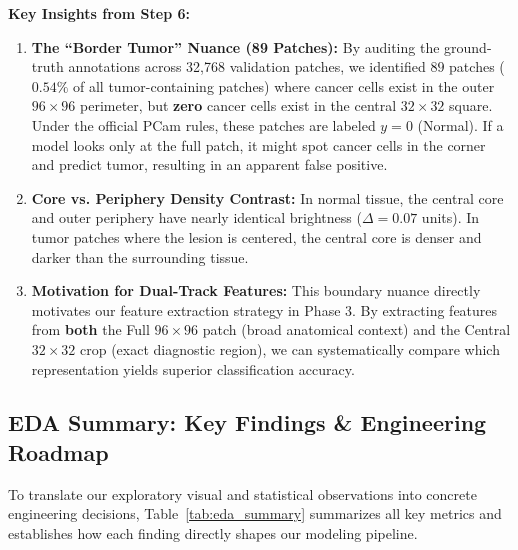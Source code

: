 \documentclass[11pt,a4paper]{article}
\begin{document}
\noindent\textbf{Key Insights from Step 6:}
\begin{enumerate}[noitemsep]
    \item \textbf{The ``Border Tumor'' Nuance (89 Patches):}
    By auditing the ground-truth annotations across 32,768 validation patches, we identified $89$ patches ($0.54\%$ of all tumor-containing patches) where cancer cells exist in the outer $96 \times 96$ perimeter, but \textbf{zero} cancer cells exist in the central $32 \times 32$ square. Under the official PCam rules, these patches are labeled $y = 0$ (Normal). If a model looks only at the full patch, it might spot cancer cells in the corner and predict tumor, resulting in an apparent false positive.
    \item \textbf{Core vs. Periphery Density Contrast:}
    In normal tissue, the central core and outer periphery have nearly identical brightness ($\Delta = 0.07$ units). In tumor patches where the lesion is centered, the central core is denser and darker than the surrounding tissue.
    \item \textbf{Motivation for Dual-Track Features:}
    This boundary nuance directly motivates our feature extraction strategy in Phase 3. By extracting features from \textbf{both} the Full $96 \times 96$ patch (broad anatomical context) and the Central $32 \times 32$ crop (exact diagnostic region), we can systematically compare which representation yields superior classification accuracy.
\end{enumerate}

\subsection{EDA Summary: Key Findings \& Engineering Roadmap}
To translate our exploratory visual and statistical observations into concrete engineering decisions, Table~\ref{tab:eda_summary} summarizes all key metrics and establishes how each finding directly shapes our modeling pipeline.
\end{document}
